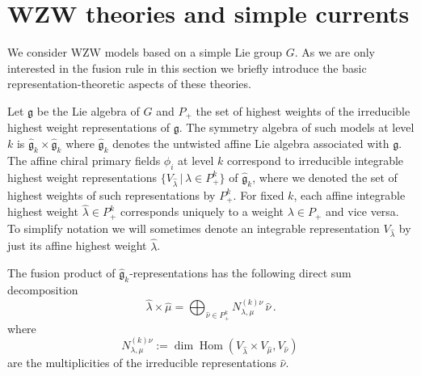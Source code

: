 \documentclass[a4paper,11pt]{article}
\theoremstyle{plain}
\theoremstyle{definition}
\newcommand{\mycomment}[1]{}
\newcommand{\dimh}{\operatorname{dim}\operatorname{Hom}}
\newcommand{\affg}{\hat{\mathfrak{g}}}
\begin{document}






\section{WZW theories and simple currents} \label{sec2}



We consider  WZW models \cite{WZW1,WZW2,WZW6} based on    a simple Lie group $G$. 
As we are only interested in the fusion rule in this section we briefly introduce the basic representation-theoretic aspects of these theories.

Let $\mathfrak{g}$ be the Lie algebra of $G$ and $P_+$  the set of highest weights of the irreducible highest weight representations of $\mathfrak{g}$. The symmetry algebra of such models at level $k$ is $\hat{\mathfrak{g}}_k\times \hat{\mathfrak{g}}_k$ where $\hat{\mathfrak{g}}_k$ denotes the untwisted affine Lie algebra associated with $\mathfrak{g}$. The affine chiral primary fields $\phi_i$ at level $k$ correspond to  irreducible integrable highest weight representations $\{V_{\hat{\lambda}}\,|\,\hat{\lambda}\in P_+^k\}$ of $\hat{\mathfrak{g}}_k$, where we denoted the set of highest weights of such representations by $P_+^k$. For fixed $k$, each affine integrable highest weight $\hat{\lambda}\in P_+^k$ corresponds uniquely to a weight $\lambda\in P_+$ and vice versa.   To simplify notation we will sometimes denote an integrable representation $V_{\hat{\lambda}}$ by just its affine highest weight $\hat{\lambda}$.

\mycomment{
For given $G$ the category  $\mathcal{C}_k(\mathfrak{g})$ generated by the irreducible   integrable $\affg_k$ representations  is a modular tensor category \cite{WZW3,WZW4,WZW5}. The simple objects of this category are $\{V_{\hat{\lambda}}\,|\,\hat{\lambda}\in P_+^k\}$ and the affine tensor product will be denoted by $\times$ as opposed to the tensor product $\otimes$ of $\mathfrak{g}$-representations. To simplify notation we will sometimes denote an integrable representation $V_{\hat{\lambda}}$ by just its affine highest weight $\hat{\lambda}$.
}
The   fusion product of $\affg_k$-representations has the following  direct sum decomposition 
\begin{equation}
    \hat{\lambda}\times \hat{\mu}=\bigoplus_{\hat{\nu}\in P_+^k} N^{(k)\nu}_{\lambda,\mu}\, \hat{\nu}\,.
\end{equation}
where
\begin{equation}
     N^{(k)\nu}_{\lambda,\mu}:= \dimh(V_{\hat{\lambda}}\times V_{\hat{\mu}},V_{\hat{\nu}})\,
\end{equation}
are the multiplicities of the irreducible representations $\hat \nu$. 
\end{document}
